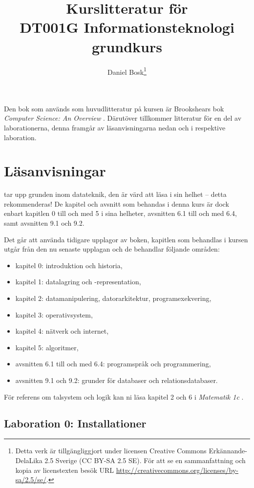\documentclass[a4paper,logo]{miunart}
\title{Kurslitteratur för\\DT001G Informationsteknologi grundkurs}
\author{Daniel Bosk\footnote{%
	Detta verk är tillgängliggjort under licensen Creative Commons 
	Erkännande-DelaLika 2.5 Sverige (CC BY-SA 2.5 SE).
	För att se en sammanfattning och kopia av licenstexten besök URL 
	\url{http://creativecommons.org/licenses/by-sa/2.5/se/}.
}}
\date{\svnId}
\begin{document}
\maketitle
\noindent
Den bok som används som huvudlitteratur på kursen är Brookshears bok 
\emph{Computer Science: An Overview} \citep{Brookshear2012csa}.
Därutöver tillkommer litteratur för en del av laborationerna, denna framgår av 
läsanvisningarna nedan och i respektive laboration.


\section*{Läsanvisningar}
\noindent
\citet{Brookshear2012csa} tar upp grunden inom datateknik, den är värd att läsa 
i sin helhet -- detta rekommenderas!
De kapitel och avsnitt som behandas i denna kurs är dock enbart kapitlen 0 till 
och med 5 i sina helheter, avsnitten 6.1 till och med 6.4, samt avsnitten 9.1 
och 9.2.

Det går att använda tidigare upplagor av boken, kapitlen som behandlas i kursen 
utgår från den nu senaste upplagan \citep{Brookshear2012csa} och de behandlar 
följande områden:
\begin{itemize}
	\item kapitel 0: introduktion och historia,
	\item kapitel 1: datalagring och -representation,
	\item kapitel 2: datamanipulering, datorarkitektur, programexekvering,
	\item kapitel 3: operativsystem,
	\item kapitel 4: nätverk och internet,
	\item kapitel 5: algoritmer,
	\item avsnitten 6.1 till och med 6.4: programspråk och programmering,
	\item avsnitten 9.1 och 9.2: grunder för databaser och relationsdatabaser.
\end{itemize}

För referens om talsystem och logik kan ni läsa kapitel 2 och 
6 i \emph{Matematik 1c} \citep{Bosk2011m1c}.


\subsection*{Laboration 0: Installationer}
\noindent

\end{document}
